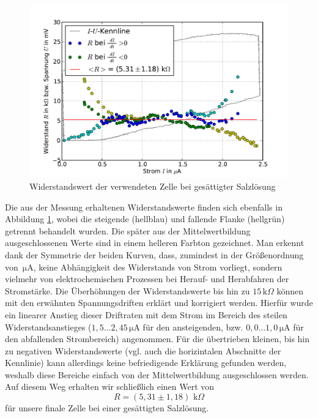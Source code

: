 \documentclass[11pt]{scrartcl}
\newcommand{\unit}[1]{\ensuremath{\,\mathrm{#1}}} %
\begin{document}
\begin{figure}[ht]
\begin{center}
\includegraphics[width=1.0\textwidth]{images/messung_widerstand.pdf}
\end{center}
\vspace{-1.5\baselineskip}
\caption{Widerstandswert der verwendeten Zelle bei gesättigter Salzlösung}
\label{widerstand_zelle}
\end{figure}

Die aus der Messung erhaltenen Widerstandswerte finden sich ebenfalls in Abbildung \ref{widerstand_zelle}, wobei die steigende (hellblau) und fallende Flanke (hellgrün) getrennt behandelt wurden. Die später aus der Mittelwertbildung ausgeschlossenen Werte sind in einem helleren Farbton gezeichnet. Man erkennt dank der Symmetrie der beiden Kurven, dass, zumindest in der Größenordnung von $\unit{\mu A}$, keine Abhängigkeit des Widerstands von Strom vorliegt, sondern vielmehr von elektrochemischen Prozessen bei Herauf- und Herabfahren der Stromstärke.
Die Überhöhungen der Widerstandswerte bis hin zu $15 \unit{k}\Omega$ können mit den erwähnten Spannungsdriften  erklärt und korrigiert werden. Hierfür wurde ein linearer Anstieg dieser Driftraten mit dem Strom im Bereich des steilen Widerstandsanstieges ($1,5\ldots2,45 \unit{\mu A}$ für den ansteigenden, bzw. $0,0\ldots1,0 \unit{\mu A}$ für den abfallenden Strombereich) angenommen. Für die übertrieben kleinen, bis hin zu negativen Widerstandswerte (vgl. auch die horizintalen Abschnitte der Kennlinie) kann allerdings keine befriedigende Erklärung gefunden werden, weshalb diese Bereiche einfach von der Mittelwertbildung ausgeschlossen werden. Auf diesem Weg erhalten wir schließlich einen Wert von
\begin{equation}
R = (5,31 \pm 1,18) \, \unit{k}\Omega
\end{equation}
für unsere finale Zelle bei einer gesättigten Salzlösung.
\end{document}
